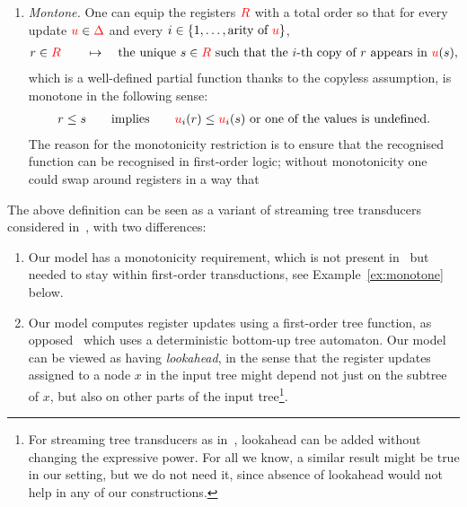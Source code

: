 \begin{definition}
\begin{itemize}
\begin{enumerate}
        \item \emph{Montone.} One can equip the registers ${{\color{red}{R}}}$ with a total order so that for every update ${\color{red}{u}} \in {\color{red}{\Delta}}$ and  every $i \in \{1,\ldots,\text{arity of ${\color{red}{u}}$}\}$,
        \begin{align*} 
            r \in {{\color{red}{R}}} \qquad \mapsto \quad \text{the unique $s \in {{\color{red}{R}}}$ such that the $i$-th copy of $r$ appears in ${\color{red}{u}}(s)$},
        \end{align*}
        which is a well-defined partial function thanks to the copyless assumption, is monotone in the following sense:
        \begin{align*}
            r \leq s \qquad \text{implies} \qquad  {\color{red}{u}}_i(r) \le  {\color{red}{u}}_i(s) \text{ or one of the values is undefined.}
        \end{align*}
        The reason for the monotonicity restriction is to ensure that the recognised function can be recognised in first-order logic; without monotonicity one could swap around registers in a way that 
    \end{enumerate}
    \end{itemize}
\end{definition}
The above definition can be seen as a variant of streaming tree transducers considered in~\cite{alur2017streaming}, with two differences:
\begin{enumerate}
    \item Our model has a monotonicity requirement, which is not present in~\cite{alur2017streaming} but needed to stay within first-order transductions, see Example~\ref{ex:monotone} below. 
    \item Our model  computes register updates using  a first-order tree function, as opposed~\cite{alur2017streaming} which uses a deterministic bottom-up tree automaton. Our model can be viewed as having \emph{lookahead}, in the sense that  the register updates assigned to a node $x$ in the input tree might depend not just on the subtree of $x$, but also on other parts of the input tree\footnote{For streaming tree transducers as in~\cite{alur2017streaming}, lookahead can be added without changing the expressive power. For all we know, a  similar result might be true in our setting, but we do not need it, since absence of lookahead would not help in any of our constructions.  }. 

\end{enumerate}
 
